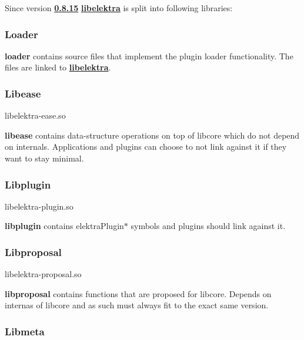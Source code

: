 Since version {\bfseries \hyperlink{doc_decisions_library_split_md}{0.8.15}} {\bfseries \hyperlink{md_src_libs_elektra_README_src_libs_elektra_README_md}{libelektra}} is split into following libraries\+:

 \subsubsection*{Loader}

{\bfseries loader} contains source files that implement the plugin loader functionality. The files are linked to {\bfseries \hyperlink{md_src_libs_elektra_README_src_libs_elektra_README_md}{libelektra}}.

\subsubsection*{Libease}

\begin{DoxyVerb}libelektra-ease.so
\end{DoxyVerb}


{\bfseries libease} contains data-\/structure operations on top of libcore which do not depend on internals. Applications and plugins can choose to not link against it if they want to stay minimal.

\subsubsection*{Libplugin}

\begin{DoxyVerb}libelektra-plugin.so
\end{DoxyVerb}


{\bfseries libplugin} contains {\ttfamily elektra\+Plugin$\ast$} symbols and plugins should link against it.

\subsubsection*{Libproposal}

\begin{DoxyVerb}libelektra-proposal.so
\end{DoxyVerb}


{\bfseries libproposal} contains functions that are proposed for libcore. Depends on internas of libcore and as such must always fit to the exact same version.

\subsubsection*{Libmeta}

